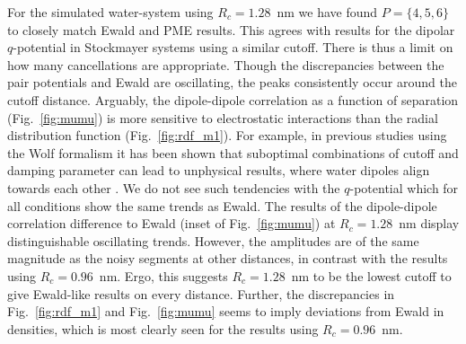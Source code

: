 \documentclass[
journal=jctcce,
manuscript=letter]{achemso}
\begin{document}
For the simulated water-system using $R_c=1.28$~nm we have found $P=\{4,5,6\}$ to closely match Ewald and PME results.
This agrees with results for the dipolar $q$-potential in Stockmayer systems using a similar cutoff\cite{Stenqvist2019shortranged}.
There is thus a limit on how many cancellations are appropriate. Though the discrepancies between the pair potentials and Ewald are oscillating, the peaks consistently occur around the cutoff distance. 
Arguably, the dipole-dipole correlation as a function of separation (Fig.~\ref{fig:mumu}) is more sensitive to electrostatic interactions than the radial distribution function (Fig.~\ref{fig:rdf_m1}).
For example, in previous studies using the Wolf formalism it has been shown that suboptimal combinations of cutoff and damping parameter can lead to unphysical results, where water dipoles align towards each other \cite{Stenqvist2015Direct,Wirnsberger2016}. We do not see such tendencies with the $q$-potential which for all conditions show the same trends as Ewald. The results of the dipole-dipole correlation difference to Ewald (inset of Fig.~\ref{fig:mumu}) at $R_c=1.28$~nm display distinguishable oscillating trends. However, the amplitudes are of the same magnitude as the noisy segments at other distances, in contrast with the results using $R_c=0.96$~nm. Ergo, this suggests $R_c=1.28$~nm to be the lowest cutoff to give Ewald-like results on every distance. 
Further, the discrepancies in Fig.~\ref{fig:rdf_m1} and Fig.~\ref{fig:mumu} seems to imply deviations from Ewald in densities, which is most clearly seen for the results using $R_c=0.96$~nm.
\end{document}
